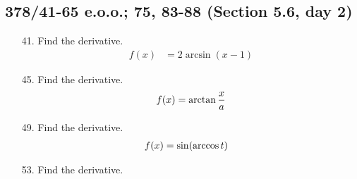 \documentclass[11pt]{article}
\begin{document}
\subsection{378/41-65 e.o.o.; 75, 83-88 (Section 5.6, day 2)}
\begin{enumerate}
	\item[41. ] Find the derivative.
		\begin{align}
			f(x) &= 2 \arcsin (x-1)
		\end{align}
	\item[45. ] Find the derivative.
		\begin{align}
			\setcounter{equation}{0}
			f(x) &= \arctan \frac{x}{a} \\ %
		\end{align}
	\item[49. ] Find the derivative.
		\begin{align}
			\setcounter{equation}{0}
			f(x) &= \sin (\arccos t)
		\end{align}
	\item[53. ] Find the derivative.
	\end{enumerate}
\end{document}
